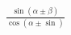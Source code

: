 \documentclass[preview]{standalone}
\begin{document}
\begin{align*}
\frac{\sin(\alpha\pm\beta)}{\cos(\alpha\pm\sin)}
\end{align*}
\end{document}
